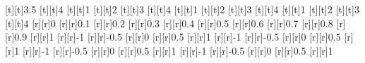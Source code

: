 \begin{psfrags}
[t][t]{3.5}%
[t][t]{4}%
[t][t]{1}%
[t][t]{2}%
[t][t]{3}%
[t][t]{4}%
[t][t]{1}%
[t][t]{2}%
[t][t]{3}%
[t][t]{4}%
[t][t]{1}%
[t][t]{2}%
[t][t]{3}%
[t][t]{4}%
%
[r][r]{0}%
[r][r]{0.1}%
[r][r]{0.2}%
[r][r]{0.3}%
[r][r]{0.4}%
[r][r]{0.5}%
[r][r]{0.6}%
[r][r]{0.7}%
[r][r]{0.8}%
[r][r]{0.9}%
[r][r]{1}%
[r][r]{-1}%
[r][r]{-0.5}%
[r][r]{0}%
[r][r]{0.5}%
[r][r]{1}%
[r][r]{-1}%
[r][r]{-0.5}%
[r][r]{0}%
[r][r]{0.5}%
[r][r]{1}%
[r][r]{-1}%
[r][r]{-0.5}%
[r][r]{0}%
[r][r]{0.5}%
[r][r]{1}%
[r][r]{-1}%
[r][r]{-0.5}%
[r][r]{0}%
[r][r]{0.5}%
[r][r]{1}%
%
%
\end{psfrags}%
%
